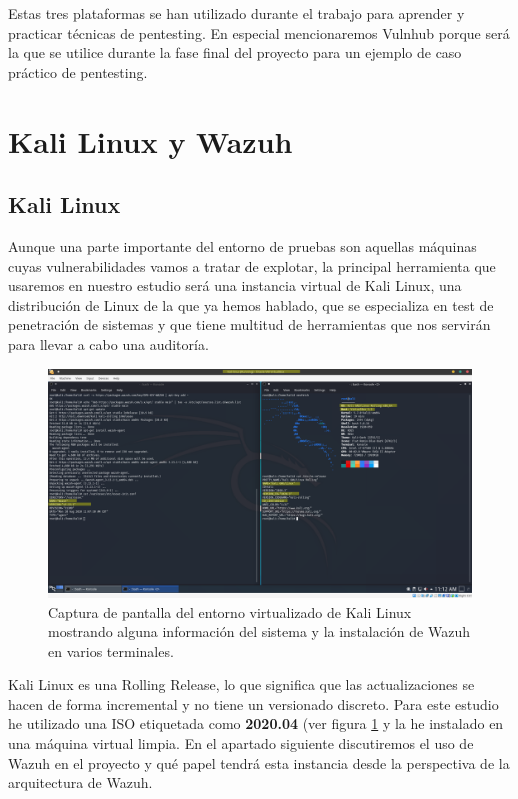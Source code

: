 Estas tres plataformas se han utilizado durante el trabajo para aprender y practicar técnicas de pentesting. En especial mencionaremos Vulnhub porque será la que se utilice durante la fase final del proyecto para un ejemplo de caso práctico de pentesting.

\section{Kali Linux y Wazuh}

\subsection{Kali Linux}

Aunque una parte importante del entorno de pruebas son aquellas máquinas cuyas vulnerabilidades vamos a tratar de explotar, la principal herramienta que usaremos en nuestro estudio será una instancia virtual de Kali Linux, una distribución de Linux de la que ya hemos hablado, que se especializa en test de penetración de sistemas y que tiene multitud de herramientas que nos servirán para llevar a cabo una auditoría.

\begin{figure}[!hbt]
  \centering
  \includegraphics[width=\textwidth]{imagenes/kali_linux.png}
  \caption{Captura de pantalla del entorno virtualizado de Kali Linux mostrando alguna información del sistema y la instalación de Wazuh en varios terminales.}
  \label{kali1}
\end{figure}


Kali Linux es una \Gls{Rolling Release}, lo que significa que las actualizaciones se hacen de forma incremental y no tiene un versionado discreto. Para este estudio he utilizado una ISO etiquetada como \textbf{2020.04} (ver figura \ref{kali1} y la he instalado en una máquina virtual limpia. En el apartado siguiente discutiremos el uso de Wazuh en el proyecto y qué papel tendrá esta instancia desde la perspectiva de la arquitectura de Wazuh.

